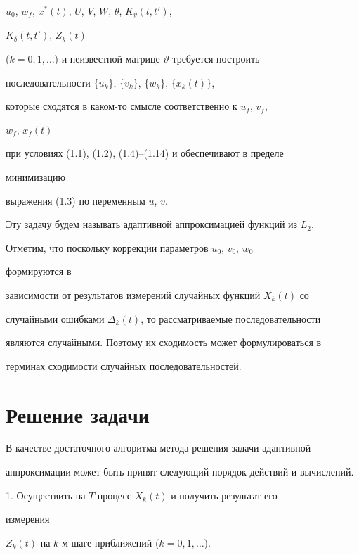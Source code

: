 $u_0$, $w_f$, $x^*(t)$, $U$, $V$, $W$, $\theta$, $K_y(t,t')$, 


$K_\delta(t,t')$, $Z_k(t)$  


($k=0,1,\dotsc$) и неизвестной матрице $\vartheta$ требуется построить 


последовательности $\{u_k\}$, $\{v_k\}$, $\{w_k\}$, $\{x_k(t)\}$, 


которые сходятся в каком-то смысле соответственно к $u_f$, $v_f$, 


$w_f$, $x_f(t)$ 


при условиях (1.1), (1.2), (1.4)--(1.14) и обеспечивают в пределе 


минимизацию 


выражения (1.3) по переменным $u$, $v$. 


Эту задачу будем называть адаптивной аппроксимацией функций из $L_2$. 


 


Отметим, что поскольку коррекции параметров $u_0$, $v_0$, $w_0$ 


формируются в 


зависимости от результатов измерений случайных функций $X_k(t)$ со 


случайными ошибками $\Delta_k(t)$, то рассматриваемые последовательности 


являются случайными. Поэтому их сходимость может формулироваться в 


терминах сходимости случайных последовательностей. 


 


\section{Решение задачи} 


 


В качестве достаточного алгоритма метода решения задачи адаптивной 


аппроксимации может быть принят следующий порядок действий и вычислений. 


 


1. Осуществить на $T$ процесс $X_k(t)$ и получить результат его 


измерения 


$Z_k(t)$ на $k$-м шаге приближений ($k=0,1,\dotsc$). 


